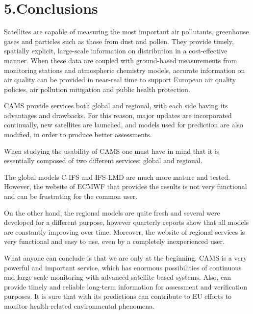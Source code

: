 \documentclass[9pt]{report}
\begin{document}
\section{5.\hspace*{0.5em}Conclusions}\label{sec-conclusions}%

\noindent{}Satellites are capable of measuring the most important air pollutants, greenhouse gases and particles such as those from dust and pollen. They provide timely, spatially explicit, large-scale information on distribution in a cost-effective manner. When these data are coupled with ground-based measurements from monitoring stations and atmospheric chemistry models, accurate information on air quality can be provided in near-real time to support European air quality policies, air pollution mitigation and public health protection.%

CAMS provide services both global and regional, with each side having its advantages and drawbacks. For this reason, major updates are incorporated continually, new satellites are launched, and models used for prediction are also modified, in order to produce better assessments.%

When studying the usability of CAMS one must have in mind that it is essentially composed of two different services: global and regional.%

The global models C-IFS and IFS-LMD are much more mature and tested. However, the website of ECMWF that provides the results is not very functional and can be frustrating for the common user.%

On the other hand, the regional models are quite fresh and several were developed for a different purpose, however quarterly reports show that all models are constantly improving over time. Moreover, the website of regional services is very functional and easy to use, even by a completely inexperienced user.%

What anyone can conclude is that we are only at the beginning. CAMS is a very powerful and important service, which has enormous possibilities of continuous and large-scale monitoring with advanced satellite-based systems. Also, can provide timely and reliable long-term information for assessment and verification purposes. It is sure that with its predictions can contribute to EU efforts to monitor health-related environmental phenomena.%
\end{document}
